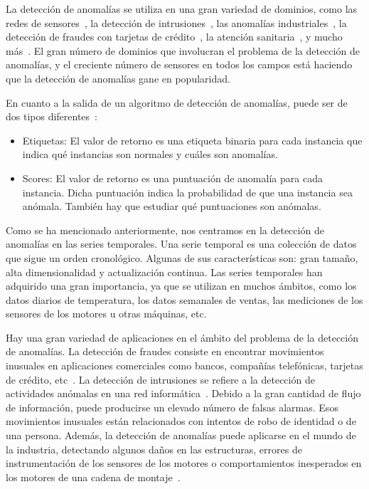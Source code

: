 \documentclass{article}
\begin{document}
	La detección de anomalías se utiliza en una gran variedad de dominios, como las redes de sensores~\cite{kraljevski2021machine}, la detección de intrusiones~\cite{kilincer2021machine}, las anomalías industriales~\cite{bayram2021real}, la detección de fraudes con tarjetas de crédito~\cite{forough2021ensemble}, la atención sanitaria~\cite{dwivedi2021novel}, y mucho más~\cite{goldstein2016comparative}. El gran número de dominios que involucran el problema de la detección de anomalías, y el creciente número de sensores en todos los campos está haciendo que la detección de anomalías gane en popularidad.

	En cuanto a la salida de un algoritmo de detección de anomalías, puede ser de dos tipos diferentes~\cite{chandola2009anomaly}:
	
	\begin{itemize}
		\item Etiquetas: El valor de retorno es una etiqueta binaria para cada instancia que indica qué instancias son normales y cuáles son anomalías.
	
		\item Scores: El valor de retorno es una puntuación de anomalía para cada instancia. Dicha puntuación indica la probabilidad de que una instancia sea anómala. También hay que estudiar qué puntuaciones son anómalas.
	\end{itemize}
	
	Como se ha mencionado anteriormente, nos centramos en la detección de anomalías en las series temporales. Una serie temporal es una colección de datos que sigue un orden cronológico. Algunas de sus características son: gran tamaño, alta dimensionalidad y actualización continua. Las series temporales han adquirido una gran importancia, ya que se utilizan en muchos ámbitos, como los datos diarios de temperatura, los datos semanales de ventas, las mediciones de los sensores de los motores u otras máquinas, etc.

	Hay una gran variedad de aplicaciones en el ámbito del problema de la detección de anomalías. La detección de fraudes consiste en encontrar movimientos inusuales en aplicaciones comerciales como bancos, compañías telefónicas, tarjetas de crédito, etc~\cite{forough2021ensemble}. La detección de intrusiones se refiere a la detección de actividades anómalas en una red informática~\cite{kilincer2021machine}. Debido a la gran cantidad de flujo de información, puede producirse un elevado número de falsas alarmas. Esos movimientos inusuales están relacionados con intentos de robo de identidad o de una persona. Además, la detección de anomalías puede aplicarse en el mundo de la industria, detectando algunos daños en las estructuras, errores de instrumentación de los sensores de los motores o comportamientos inesperados en los motores de una cadena de montaje~\cite{bayram2021real}.
	
\end{document}
